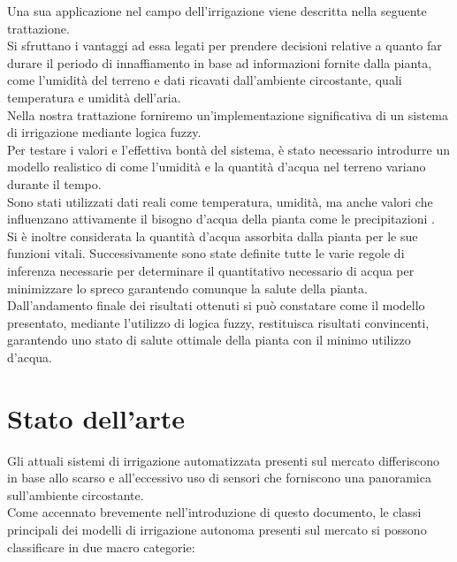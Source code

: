 \documentclass[conference,10pt]{IEEEtran}
\begin{document}
Una sua applicazione nel campo dell'irrigazione viene descritta nella seguente trattazione. \\ Si sfruttano i vantaggi ad essa legati per prendere decisioni relative a quanto far durare il periodo di innaffiamento in base ad informazioni fornite dalla pianta, come l'umidità del terreno e dati ricavati dall'ambiente circostante, quali temperatura e umidità dell'aria.\\
Nella nostra trattazione forniremo un'implementazione significativa di un sistema di irrigazione mediante logica fuzzy. \\
Per testare i valori e l'effettiva bontà del sistema, è stato necessario introdurre un modello realistico di come l'umidità e la quantità d'acqua nel terreno variano durante il tempo.\\
Sono stati utilizzati dati reali come temperatura, umidità, ma anche valori che influenzano attivamente il bisogno d'acqua della pianta come le precipitazioni \cite{7}.\\ Si è inoltre considerata la quantità d'acqua assorbita dalla pianta per le sue funzioni vitali.
Successivamente sono state definite tutte le varie regole di inferenza necessarie per determinare il quantitativo necessario di acqua per minimizzare lo spreco garantendo comunque la salute della pianta.\\
Dall'andamento finale dei risultati ottenuti si può constatare come il modello presentato, mediante l'utilizzo di logica fuzzy, restituisca risultati convincenti, garantendo uno stato di salute ottimale della pianta con il minimo utilizzo d'acqua.


\section{Stato dell'arte}\label{sec:sota}
Gli attuali sistemi di irrigazione automatizzata presenti sul mercato differiscono in base allo scarso e all'eccessivo uso di sensori che forniscono una panoramica sull'ambiente circostante.\\
Come accennato brevemente nell'introduzione di questo documento, le classi principali dei modelli di irrigazione autonoma presenti sul mercato si possono classificare in due macro categorie:
\end{document}
